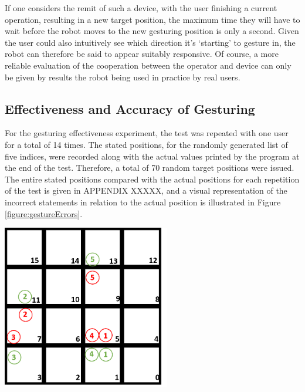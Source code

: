\documentclass[11pt]{article}
\begin{document}
If one considers the remit of such a device, with the user finishing a current operation, resulting in a new target position, the maximum time they will have to wait before the robot moves to the new gesturing position is only a second. Given the user could also intuitively see which direction it's `starting' to gesture in, the robot can therefore be said to appear suitably responsive. Of course, a more reliable evaluation of the cooperation between the operator and device can only be given by results the robot being used in practice by real users.

\subsection{Effectiveness and Accuracy of Gesturing}

For the gesturing effectiveness experiment, the test was repeated with one user for a total of 14 times. The stated positions, for the randomly generated list of five indices, were recorded along with the actual values printed by the program at the end of the test. Therefore, a total of 70 random target positions were issued. The entire stated positions compared with the actual positions for each repetition of the test is given in APPENDIX XXXXX, and a visual representation of the incorrect statements in relation to the actual position is illustrated in Figure \ref{figure:gestureErrors}.

\begin{center}
\includegraphics[width=0.55\textwidth]{images/gestureErrors.png}
\label{figure:gestureErrors}
\end{center}
\end{document}
